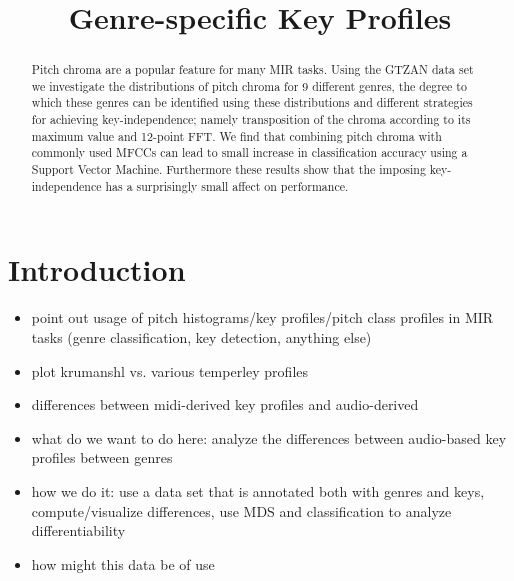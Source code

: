 \documentclass{article}
\title{Genre-specific Key Profiles}
\begin{document}
%
\maketitle
%
\begin{abstract}
Pitch chroma are a popular feature for many MIR tasks. Using the GTZAN data set we investigate the distributions of pitch chroma for 9 different genres, the degree to
which these genres can be identified using these distributions and different strategies for achieving key-independence; namely transposition of the chroma according to its maximum value and 12-point FFT. We find that combining pitch chroma with commonly used MFCCs can lead to small increase in classification accuracy using a Support Vector Machine. Furthermore these results show that the imposing key-independence has a surprisingly small affect on performance.
\end{abstract}
%
\section{Introduction}\label{sec:introduction}
\begin{itemize}
    \item   point out usage of pitch histograms/key profiles/pitch class profiles in MIR tasks (genre classification, key detection, anything else)
    \item   plot krumanshl vs. various temperley profiles
    \item   differences between midi-derived key profiles and audio-derived \cite{purwins_new_2000, gomez_tonal_2006}
    \item   what do we want to do here: analyze the differences between audio-based key profiles between genres
    \item   how we do it: use a data set that is annotated both with genres and keys, compute/visualize differences, use MDS and classification to analyze differentiability
    \item   how might this data be of use
\end{itemize}
\end{document}
